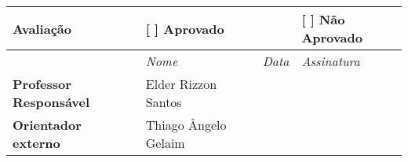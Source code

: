 \begin{table}[H]
\centering
\begin{tabular}{|l|lll|}
\hline
\textbf{Avaliação}          & \textbf{[ ] Aprovado}      & \textbf{}                & \textbf{[ ] Não Aprovado} \\ \hline
 & \textit{Nome} & \textit{Data} & \textit{Assinatura}                                                                                     \\ \hline
\textbf{Professor Responsável} & \multicolumn{1}{l|}{Elder Rizzon Santos} & \multicolumn{1}{l|}{ } &  \\ \hline
\textbf{Orientador externo} & \multicolumn{1}{l|}{Thiago Ângelo Gelaim} & \multicolumn{1}{l|}{} &                      \\ \hline
\end{tabular}
\end{table}